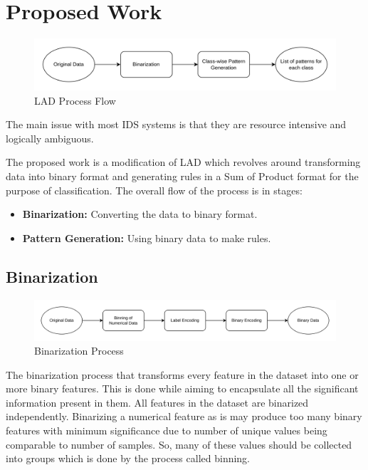 \documentclass[pdflatex,sn-mathphys-num]{sn-jnl}%
\let\oldcaption\caption
\renewcommand{\caption}[1]{\oldcaption{\centering #1}}
\theoremstyle{thmstyleone}%
\theoremstyle{thmstyletwo}%
\theoremstyle{thmstylethree}%
\begin{document}
\section{Proposed Work}\label{sec:Methodology}
\begin{figure}[ht!]
  \centering
  \includegraphics[width=\linewidth]{Methedology.drawio.png}
  \caption{LAD Process Flow}
  \label{fig:LAD}
\end{figure}

The main issue with most IDS systems is that they are resource intensive and logically ambiguous.

The proposed work is a modification of LAD which revolves around transforming data into binary format and generating rules in a Sum of Product format for the purpose of classification. The overall flow of the process is in stages:

\begin{itemize}
  \item \textbf{Binarization:} Converting the data to binary format.
  \item \textbf{Pattern Generation:} Using binary data to make rules.
\end{itemize}


\subsection{Binarization}

\begin{figure}[ht!]
  \centering
  \includegraphics[width=\linewidth]{Binarization.drawio.png}
  \caption{Binarization Process}
  \label{fig:Binarization}
\end{figure}

The binarization process that transforms every feature in the dataset into one or more binary features.
This is done while aiming to encapsulate all the significant information present in them.
All features in the dataset are binarized independently.
Binarizing a numerical feature as is may produce too many binary features with minimum significance due to number of unique values being comparable to number of samples.
So, many of these values should be collected into groups which is done by the process called binning.
\end{document}
